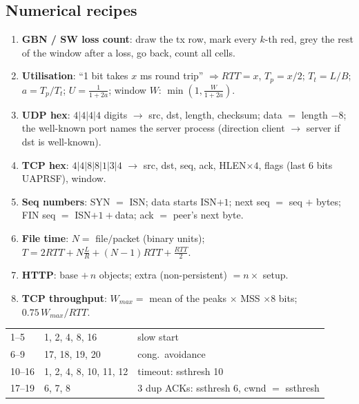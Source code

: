 \begin{multicols*}{3}
\section*{Numerical recipes}
\begin{enumerate}
  \item \textbf{GBN / SW loss count}: draw the tx row, mark every $k$-th red, grey the rest of the window after a loss, go back, count all cells.
  \item \textbf{Utilisation}: ``1 bit takes $x$ ms round trip'' $\Rightarrow RTT=x$, $T_p=x/2$; $T_t=L/B$; $a=T_p/T_t$; $U=\frac{1}{1+2a}$; window $W$: $\min(1,\frac{W}{1+2a})$.
  \item \textbf{UDP hex}: $4|4|4|4$ digits $\to$ src, dst, length, checksum; data $=$ length $-8$; the well-known port names the server process (direction client $\to$ server if dst is well-known).
  \item \textbf{TCP hex}: $4|4|8|8|1|3|4$ $\to$ src, dst, seq, ack, HLEN$\times4$, flags (last 6 bits UAPRSF), window.
  \item \textbf{Seq numbers}: SYN $=$ ISN; data starts ISN$+1$; next seq $=$ seq $+$ bytes; FIN seq $=$ ISN$+1+$data; ack $=$ peer's next byte.
  \item \textbf{File time}: $N=$ file$/$packet (binary units); $T=2RTT+N\frac{L}{R}+(N{-}1)RTT+\frac{RTT}{2}$.
  \item \textbf{HTTP}: base $+\,n$ objects; extra (non-persistent) $=n\times$ setup.
  \item \textbf{TCP throughput}: $W_{max}=$ mean of the peaks $\times$ MSS $\times 8$ bits; $0.75\,W_{max}/RTT$.
\end{enumerate}

\noindent\begin{minipage}{\linewidth}
 
\begin{center}\scriptsize\zebra
\begin{tabularx}{\linewidth}{@{}L{10mm}YL{40mm}@{}}\toprule
{} &  & \\--5 & 1, 2, 4, 8, 16 & slow start\\
6--9 & 17, 18, 19, 20 & cong.\ avoidance\\
10--16 & 1, 2, 4, 8, 10, 11, 12 & timeout: ssthresh 10\\
17--19 & 6, 7, 8 & 3 dup ACKs: ssthresh 6, cwnd $=$ ssthresh\\\bottomrule
\end{tabularx}
\end{center}
\end{minipage}


\end{multicols*}

